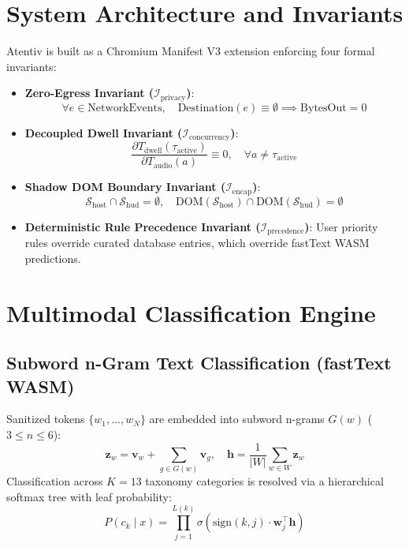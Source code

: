 \documentclass[conference]{IEEEtran}
\begin{document}
\section{System Architecture and Invariants}
Atentiv is built as a Chromium Manifest V3 extension enforcing four formal invariants:
\begin{itemize}
    \item \textbf{Zero-Egress Invariant ($\mathcal{I}_{\text{privacy}}$)}:
    \begin{equation}
    \forall e \in \text{NetworkEvents}, \quad \text{Destination}(e) \equiv \emptyset \implies \text{BytesOut} = 0
    \end{equation}
    \item \textbf{Decoupled Dwell Invariant ($\mathcal{I}_{\text{concurrency}}$)}:
    \begin{equation}
    \frac{\partial T_{\text{dwell}}(\tau_{\text{active}})}{\partial T_{\text{audio}}(a)} \equiv 0, \quad \forall a \neq \tau_{\text{active}}
    \end{equation}
    \item \textbf{Shadow DOM Boundary Invariant ($\mathcal{I}_{\text{encap}}$)}:
    \begin{equation}
    \mathcal{S}_{\text{host}} \cap \mathcal{S}_{\text{hud}} = \emptyset, \quad \text{DOM}(\mathcal{S}_{\text{host}}) \cap \text{DOM}(\mathcal{S}_{\text{hud}}) = \emptyset
    \end{equation}
    \item \textbf{Deterministic Rule Precedence Invariant ($\mathcal{I}_{\text{precedence}}$)}: User priority rules override curated database entries, which override fastText WASM predictions.
\end{itemize}

\section{Multimodal Classification Engine}

\subsection{Subword n-Gram Text Classification (fastText WASM)}
Sanitized tokens $\{w_1, \dots, w_N\}$ are embedded into subword n-grams $G(w)$ ($3 \le n \le 6$):
\begin{equation}
\mathbf{z}_w = \mathbf{v}_w + \sum_{g \in G(w)} \mathbf{v}_g, \quad \mathbf{h} = \frac{1}{|W|}\sum_{w \in W} \mathbf{z}_w
\end{equation}
Classification across $K=13$ taxonomy categories is resolved via a hierarchical softmax tree with leaf probability:
\begin{equation}
P(c_k \mid x) = \prod_{j=1}^{L(k)} \sigma\left( \text{sign}(k, j) \cdot \mathbf{w}_j^\top \mathbf{h} \right)
\end{equation}
\end{document}
